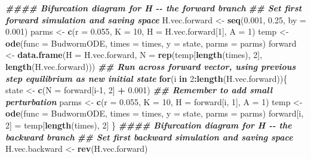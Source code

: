 \documentclass[
]{book}
\newenvironment{Shaded}{\begin{snugshade}}{\end{snugshade}}
\newcommand{\AttributeTok}[1]{\textcolor[rgb]{0.13,0.29,0.53}{#1}}
\newcommand{\ControlFlowTok}[1]{\textcolor[rgb]{0.13,0.29,0.53}{\textbf{#1}}}
\newcommand{\DecValTok}[1]{\textcolor[rgb]{0.00,0.00,0.81}{#1}}
\newcommand{\DocumentationTok}[1]{\textcolor[rgb]{0.56,0.35,0.01}{\textbf{\textit{#1}}}}
\newcommand{\FloatTok}[1]{\textcolor[rgb]{0.00,0.00,0.81}{#1}}
\newcommand{\FunctionTok}[1]{\textcolor[rgb]{0.13,0.29,0.53}{\textbf{#1}}}
\newcommand{\NormalTok}[1]{#1}
\newcommand{\OtherTok}[1]{\textcolor[rgb]{0.56,0.35,0.01}{#1}}
\newcommand{\SpecialCharTok}[1]{\textcolor[rgb]{0.81,0.36,0.00}{\textbf{#1}}}
\begin{document}
\begin{Shaded}
\begin{Highlighting}[]
\DocumentationTok{\#\#\#\# Bifurcation diagram for H {-}{-} the forward branch}
\DocumentationTok{\#\# Set first forward simulation and saving space}
\NormalTok{H.vec.forward }\OtherTok{\textless{}{-}} \FunctionTok{seq}\NormalTok{(}\FloatTok{0.001}\NormalTok{, }\FloatTok{0.25}\NormalTok{, }\AttributeTok{by =} \FloatTok{0.001}\NormalTok{)}
\NormalTok{parms }\OtherTok{\textless{}{-}} \FunctionTok{c}\NormalTok{(}\AttributeTok{r =} \FloatTok{0.055}\NormalTok{, }\AttributeTok{K =} \DecValTok{10}\NormalTok{, }\AttributeTok{H =}\NormalTok{ H.vec.forward[}\DecValTok{1}\NormalTok{], }\AttributeTok{A =} \DecValTok{1}\NormalTok{)}
\NormalTok{temp }\OtherTok{\textless{}{-}} \FunctionTok{ode}\NormalTok{(}\AttributeTok{func =}\NormalTok{ BudwormODE, }\AttributeTok{times =}\NormalTok{ times, }\AttributeTok{y =}\NormalTok{ state, }\AttributeTok{parms =}\NormalTok{ parms)}
\NormalTok{forward }\OtherTok{\textless{}{-}} \FunctionTok{data.frame}\NormalTok{(}\AttributeTok{H =}\NormalTok{ H.vec.forward,}
                      \AttributeTok{N =} \FunctionTok{rep}\NormalTok{(temp[}\FunctionTok{length}\NormalTok{(times), }\DecValTok{2}\NormalTok{], }\FunctionTok{length}\NormalTok{(H.vec.forward)))}
\DocumentationTok{\#\# Run across forward vector, using previous step equilibrium as new initial state}
\ControlFlowTok{for}\NormalTok{(i }\ControlFlowTok{in} \DecValTok{2}\SpecialCharTok{:}\FunctionTok{length}\NormalTok{(H.vec.forward))\{}
\NormalTok{  state }\OtherTok{\textless{}{-}} \FunctionTok{c}\NormalTok{(}\AttributeTok{N =}\NormalTok{ forward[i}\DecValTok{{-}1}\NormalTok{, }\DecValTok{2}\NormalTok{] }\SpecialCharTok{+} \FloatTok{0.001}\NormalTok{) }\DocumentationTok{\#\# Remember to add small perturbation}
\NormalTok{  parms }\OtherTok{\textless{}{-}} \FunctionTok{c}\NormalTok{(}\AttributeTok{r =} \FloatTok{0.055}\NormalTok{, }\AttributeTok{K =} \DecValTok{10}\NormalTok{, }\AttributeTok{H =}\NormalTok{ forward[i, }\DecValTok{1}\NormalTok{], }\AttributeTok{A =} \DecValTok{1}\NormalTok{)}
\NormalTok{  temp }\OtherTok{\textless{}{-}} \FunctionTok{ode}\NormalTok{(}\AttributeTok{func =}\NormalTok{ BudwormODE, }\AttributeTok{times =}\NormalTok{ times, }\AttributeTok{y =}\NormalTok{ state, }\AttributeTok{parms =}\NormalTok{ parms)}
\NormalTok{  forward[i, }\DecValTok{2}\NormalTok{] }\OtherTok{=}\NormalTok{ temp[}\FunctionTok{length}\NormalTok{(times), }\DecValTok{2}\NormalTok{]}
\NormalTok{\}}
\DocumentationTok{\#\#\#\# Bifurcation diagram for H {-}{-} the backward branch}
\DocumentationTok{\#\# Set first backward simulation and saving space}
\NormalTok{H.vec.backward }\OtherTok{\textless{}{-}} \FunctionTok{rev}\NormalTok{(H.vec.forward)}

\end{Highlighting}
\end{Shaded}
\end{document}
